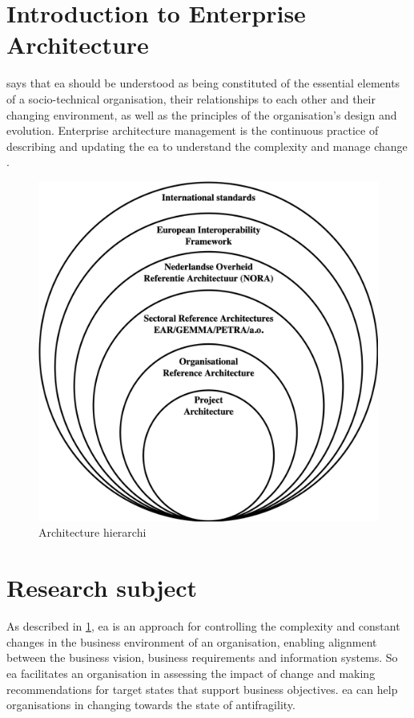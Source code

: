 \section{Introduction to Enterprise Architecture}
\label{sec:introea}





\textcite[p.~104]{Lapalme2016} says that \acrfull{ea} should be understood as being constituted of the essential elements of a socio-technical organisation, their relationships to each other and their changing environment, as well as the principles of the organisation’s design and evolution. Enterprise architecture management is the continuous practice of describing and updating the \acrshort{ea} to understand the complexity and manage change \parencite{Lapalme2016}. 

\begin{figure}[H]
	\centering
	\includegraphics[width=0.5\linewidth]{images/architectureviewonion}
	\caption[Architecture hierarchi]{Architecture hierarchi}
	\label{fig:architectureviewonion}
\end{figure}


\section{Research subject}
\label{sec:researchsubject}
As described in \cref{sec:introea},  \acrshort{ea} is an approach for controlling the complexity and constant changes in the business environment of an organisation, enabling alignment between the business vision, business requirements and information systems. So \acrshort{ea} facilitates an organisation in assessing the impact of change and making recommendations for target states that support business objectives. \acrshort{ea} can help organisations in changing towards the state of \gls{antifragility}.

